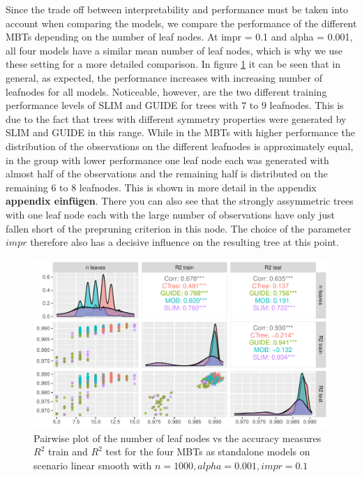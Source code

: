 Since the trade off between interpretability and performance must be taken into account when comparing the models, we compare the performance of the different MBTs depending on the number of leaf nodes. 
At impr = 0.1 and alpha = 0.001, all four models have a similar mean number of leaf nodes, which is why we use these setting for a more detailed comparison.
In figure \ref{fig:ls_1000_standalone_r2_nleaves} it can be seen that in general, as expected, the performance increases with increasing number of leafnodes for all models. Noticeable, however, are the two different training performance levels of SLIM and GUIDE for trees with $7$ to $9$ leafnodes. This is due to the fact that trees with different symmetry properties were generated by SLIM and GUIDE in this range. While in the MBTs with higher performance the distribution of the observations on the different leafnodes is approximately equal, in the group with lower performance one leaf node each was generated with almost half of the observations and the remaining half is distributed on the remaining $6$ to $8$ leafnodes. This is shown in more detail in the appendix \textbf{appendix einfügen}. There you can also see that the strongly assymmetric trees with one leaf node each with the large number of observations have only just fallen short of the prepruning criterion in this node. The choice of the parameter $impr$ therefore also has a decisive influence on the resulting tree at this point.


\begin{figure} \label{fig:ls_1000_standalone_r2_nleaves}
\caption{Pairwise plot of the number of leaf nodes vs the accuracy measures $R^2$ train and $R^2$ test for the four MBTs as standalone models on scenario linear smooth with $n=1000, alpha = 0.001, impr = 0.1$}
    \includegraphics[width=16cm]{Figures/simulations/batchtools/basic_scenarios/linear_smooth/ls_1000_standalone_r2_nleaves.pdf}
\end{figure} 


